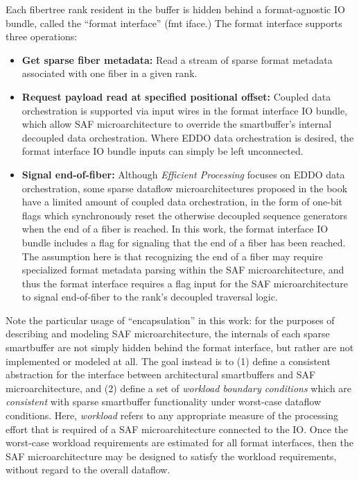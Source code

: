 Each fibertree rank resident in the buffer is hidden behind a format-agnostic IO bundle, called the ``format interface'' (fmt iface.) The format interface supports three operations:

\begin{itemize}
    \item \textbf{Get sparse fiber metadata:} Read a stream of sparse format metadata associated with one fiber in a given rank.
    \item \textbf{Request payload read at specified positional offset:} Coupled data orchestration is supported via input wires in the format interface IO bundle, which allow SAF microarchitecture to override the smartbuffer's internal decoupled data orchestration. Where EDDO data orchestration is desired, the format interface IO bundle inputs can simply be left unconnected.
    \item \textbf{Signal end-of-fiber:} Although \textit{Efficient Processing}\cite{szebook} focuses on EDDO data orchestration, some sparse dataflow microarchitectures proposed in the book have a limited amount of coupled data orchestration, in the form of one-bit flags which synchronously reset the otherwise decoupled sequence generators when the end of a fiber is reached. In this work, the format interface IO bundle includes a flag for signaling that the end of a fiber has been reached. The assumption here is that recognizing the end of a fiber may require specialized format metadata parsing within the SAF microarchitecture, and thus the format interface requires a flag input for the SAF microarchitecture to signal end-of-fiber to the rank's decoupled traversal logic.
\end{itemize}

Note the particular usage of ``encapsulation'' in this work: for the purposes of describing and modeling SAF microarchitecture, the internals of each sparse smartbuffer are not simply hidden behind the format interface, but rather are not implemented or modeled at all. The goal instead is to (1) define a consistent abstraction for the interface between architectural smartbuffers and SAF microarchitecture, and (2) define a set of \textit{workload boundary conditions} which are \textit{consistent} with sparse smartbuffer functionality under worst-case dataflow conditions. Here, \textit{workload} refers to any appropriate measure of the processing effort that is required of a SAF microarchitecture connected to the IO. Once the worst-case workload requirements are estimated for all format interfaces, then the SAF microarchitecture may be designed to satisfy the workload requirements, without regard to the overall dataflow. 


